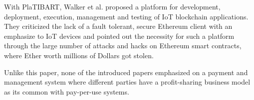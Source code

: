 With PlaTIBART, Walker et al. \cite{PlaTIBART} proposed a platform for development, deployment, execution, management and testing of IoT blockchain applications. They criticized the lack of a fault tolerant, secure Ethereum client with an emphasize to IoT devices and pointed out the necessity for such a platform through the large number of attacks and hacks on Ethereum smart contracts, where Ether worth millions of Dollars got stolen.

Unlike this paper, none of the introduced papers emphasized on a payment and management system where different parties have a profit-sharing business model as its common with pay-per-use systems.
